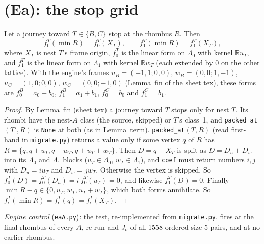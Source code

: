 \documentclass[11pt]{article}
\theoremstyle{definition}\newtheorem{definition}[theorem]{Definition}\newtheorem{remark}[theorem]{Remark}
\begin{document}
\section{(Ea): the stop grid}\label{sec:ea}
\begin{lemma}\label{lem:grid}
Let a journey toward $T\in\{B,C\}$ stop at the rhombus $R$. Then
\[f_0^T(\min R)=f_0^T(X_T),\qquad f_1^T(\min R)=f_1^T(X_T),\]
where $X_T$ is nest $T$'s frame origin, $f_0^T$ is the linear form on $\Lambda_0$ with kernel $\mathbb{R}u_T$, and $f_1^T$ is the linear form on $\Lambda_1$ with kernel $\mathbb{R}w_T$ (each extended by $0$ on the other lattice). With the engine's frames $u_B=(-1,1;0,0)$, $w_B=(0,0;1,-1)$, $u_C=(1,0;0,0)$, $w_C=(0,0;-1,0)$ (Lemma~fin of the sheet tex), these forms are $f_0^B=a_0+b_0$, $f_1^B=a_1+b_1$, $f_0^C=b_0$ and $f_1^C=b_1$.
\end{lemma}
\begin{proof}
By Lemma~fin (sheet tex) a journey toward $T$ stops only for nest $T$. Its rhombi have the nest-$A$ class (the source, skipped) or $T$'s class~1, and \texttt{packed\_at}$(T',R)$ is \texttt{None} at both (as in Lemma~term). \texttt{packed\_at}$(T,R)$ (read first-hand in \texttt{migrate.py}) returns a value only if some vertex $q$ of $R$ has $R=\{q,q+u_T,q+w_T,q+u_T+w_T\}$. Then $D=q-X_T$ is split as $D=D_u+D_w$ into its $\Lambda_0$ and $\Lambda_1$ blocks ($u_T\in\Lambda_0$, $w_T\in\Lambda_1$), and \texttt{coef} must return numbers $i,j$ with $D_u=iu_T$ and $D_w=jw_T$. Otherwise the vertex is skipped. So $f_0^T(D)=f_0^T(D_u)=i\,f_0^T(u_T)=0$, and likewise $f_1^T(D)=0$. Finally $\min R-q\in\{0,u_T,w_T,u_T+w_T\}$, which both forms annihilate. So $f_\epsilon^T(\min R)=f_\epsilon^T(q)=f_\epsilon^T(X_T)$.
\end{proof}
\noindent \emph{Engine control} (\texttt{eaA.py}): the test, re-implemented from \texttt{migrate.py}, fires at the final rhombus of every $A$, re-run and $J_o$ of all 1558 ordered size-5 pairs, and at no earlier rhombus.
\end{document}
